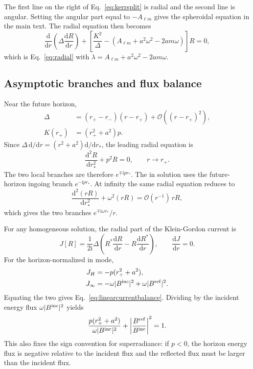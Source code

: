 \documentclass[aps,prd,twocolumn,nofootinbib,superscriptaddress,10pt,floatfix]{revtex4-2}
\newcommand{\ii}{\mathrm{i}}
\newcommand{\dd}{\mathrm{d}}
\newcommand{\calO}{\mathcal{O}}
\newcommand{\rp}{r_+}
\newcommand{\rmn}{r_-}
\newcommand{\Bin}{B^{\rm inc}}
\newcommand{\Bref}{B^{\rm ref}}
\begin{document}
The first line on the right of Eq.~\eqref{eq:kerrsplit} is radial and the
second line is angular.  Setting the angular part equal to $-A_{\ell m}$ gives
the spheroidal equation in the main text.  The radial equation then becomes
\begin{equation}
\frac{\dd}{\dd r}
\left(\Delta\frac{\dd R}{\dd r}\right)
+
\left[
\frac{K^2}{\Delta}
-\left(A_{\ell m}+a^2\omega^2-2am\omega\right)
\right]R=0,
\end{equation}
which is Eq.~\eqref{eq:radial} with
$\lambda=A_{\ell m}+a^2\omega^2-2am\omega$.

\subsection{Asymptotic branches and flux balance}

Near the future horizon,
\begin{align}
\Delta&=(\rp-\rmn)(r-\rp)
+\calO\left((r-\rp)^2\right),
\\
K(\rp)&=(\rp^2+a^2)p.
\end{align}
Since $\Delta\,\dd/\dd r=(r^2+a^2)\dd/\dd r_*$, the leading radial equation is
\begin{equation}
\frac{\dd^2R}{\dd r_*^2}+p^2R=0,
\qquad r\rightarrow\rp .
\end{equation}
The two local branches are therefore $e^{\mp\ii pr_*}$.  The in solution uses
the future-horizon ingoing branch $e^{-\ii pr_*}$.  At infinity the same radial
equation reduces to
\begin{equation}
\frac{\dd^2(rR)}{\dd r_*^2}+\omega^2(rR)=\calO(r^{-1})\,rR,
\end{equation}
which gives the two branches $e^{\mp\ii\omega r_*}/r$.

For any homogeneous solution, the radial part of the Klein-Gordon current is
\begin{equation}
J[R]
=
\frac{1}{2\ii}
\Delta\left(R^*\frac{\dd R}{\dd r}
-R\frac{\dd R^*}{\dd r}\right),
\qquad
\frac{\dd J}{\dd r}=0 .
\label{eq:currentappendix}
\end{equation}
For the horizon-normalized in mode,
\begin{align}
J_H&=-p(\rp^2+a^2),\\
J_\infty&=-\omega|\Bin|^2+\omega|\Bref|^2 .
\end{align}
Equating the two gives Eq.~\eqref{eq:linearcurrentbalance}.  Dividing by the
incident energy flux $\omega|\Bin|^2$ yields
\begin{equation}
\frac{p(\rp^2+a^2)}{\omega|\Bin|^2}
+
\left|\frac{\Bref}{\Bin}\right|^2=1.
\end{equation}
This also fixes the sign convention for superradiance: if $p<0$, the horizon
energy flux is negative relative to the incident flux and the reflected flux
must be larger than the incident flux.
\end{document}
